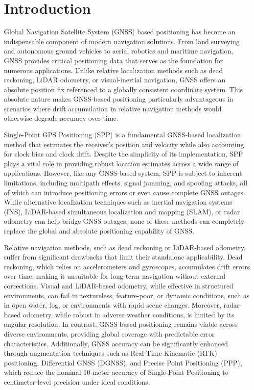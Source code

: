 \documentclass[conference]{IEEEtran}
\begin{document}
\section{Introduction}

Global Navigation Satellite System (GNSS) based positioning has become an indispensable component of modern navigation solutions. From land surveying and autonomous ground vehicles to aerial robotics and maritime navigation, GNSS provides critical positioning data that serves as the foundation for numerous applications. Unlike relative localization methods such as dead reckoning, LiDAR odometry, or visual-inertial navigation, GNSS offers an absolute position fix referenced to a globally consistent coordinate system. This absolute nature makes GNSS-based positioning particularly advantageous in scenarios where drift accumulation in relative navigation methods would otherwise degrade accuracy over time.

Single-Point GPS Positioning (SPP) is a fundamental GNSS-based localization method that estimates the receiver’s position and velocity while also accounting for clock bias and clock drift. Despite the simplicity of its implementation, SPP plays a vital role in providing robust location estimates across a wide range of applications. However, like any GNSS-based system, SPP is subject to inherent limitations, including multipath effects, signal jamming, and spoofing attacks, all of which can introduce positioning errors or even cause complete GNSS outages. While alternative localization techniques such as inertial navigation systems (INS), LiDAR-based simultaneous localization and mapping (SLAM), or radar odometry can help bridge GNSS outages, none of these methods can completely replace the global and absolute positioning capability of GNSS.

Relative navigation methods, such as dead reckoning or LiDAR-based odometry, suffer from significant drawbacks that limit their standalone applicability. Dead reckoning, which relies on accelerometers and gyroscopes, accumulates drift errors over time, making it unsuitable for long-term navigation without external corrections. Visual and LiDAR-based odometry, while effective in structured environments, can fail in textureless, feature-poor, or dynamic conditions, such as in open water, fog, or environments with rapid scene changes. Moreover, radar-based odometry, while robust in adverse weather conditions, is limited by its angular resolution. In contrast, GNSS-based positioning remains viable across diverse environments, providing global coverage with predictable error characteristics. Additionally, GNSS accuracy can be significantly enhanced through augmentation techniques such as Real-Time Kinematic (RTK) positioning, Differential GNSS (DGNSS), and Precise Point Positioning (PPP), which reduce the nominal 10-meter accuracy of Single-Point Positioning to centimeter-level precision under ideal conditions.
\end{document}
